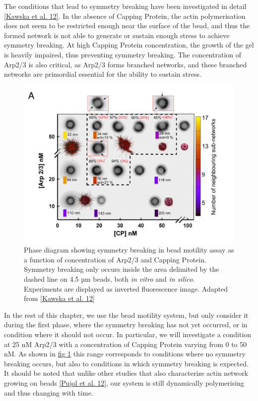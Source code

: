 \documentclass[A4paperpaper,11pt,english]{sphinxmanual}
\begin{document}
The conditions that lead to symmetry breaking have been investigated in detail
{\hyperref[parts/part1:kawska2012]{{[}Kawska et al. 12{]}}}. In the absence of Capping Protein, the actin polymerisation
does not seem to be restricted enough near the surface of the bead, and thus the formed
network is not able to generate or sustain enough stress to achieve symmetry
breaking. At high Capping Protein concentration, the growth of the gel is heavily impaired,
thus preventing symmetry breaking. The concentration of Arp2/3 is also critical,
as Arp2/3 forms branched networks, and these branched networks are primordial essential for the
ability to sustain stress.
\begin{figure}[htbp]
\centering
\capstart

\includegraphics[width=0.700\linewidth]{symmetry-breaking-phase-diagram.png}
\caption{Phase diagram showing symmetry breaking in bead motility assay as a
function of concentration of Arp2/3 and Capping Protein. Symmetry breaking
only occurs inside the area delimited by the dashed line on 4.5 µm beads, both
\emph{in vitro} and \emph{in silico}. Experiments are
displayed as inverted fluorescence image. Adapted from {\hyperref[parts/part1:kawska2012]{{[}Kawska et al. 12{]}}}}\label{parts/part1:phase-diag}\end{figure}

In the rest of this chapter, we use the bead motility system, but only
consider it during the first phase, where the symmetry breaking has not yet
occurred, or in condition where it should not occur. In particular, we will
investigate a condition at 25 nM Arp2/3 with a concentration of Capping Protein
varying from 0 to 50 nM. As shown in \hyperref[parts/part1:phase-diag]{fig  \ref*{parts/part1:phase-diag}} this range corresponds to
conditions where no symmetry breaking occurs, but also to conditions in which
symmetry breaking is expected.  It should be noted that unlike
other studies that also characterize actin network growing on beads
{\hyperref[parts/part1:pujol2012]{{[}Pujol et al. 12{]}}}, our system is still dynamically polymerising and thus
changing with time.
\end{document}
